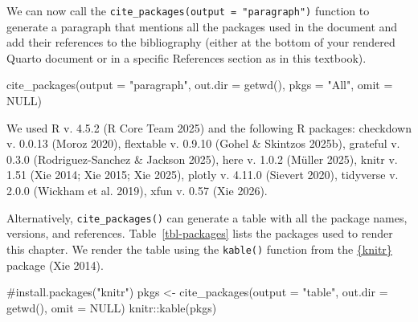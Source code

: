 \documentclass[
  letterpaper,
  DIV=11,
  numbers=noendperiod]{scrreprt}
\newenvironment{Shaded}{\begin{snugshade}}{\end{snugshade}}
\newcommand{\AttributeTok}[1]{\textcolor[rgb]{0.40,0.45,0.13}{#1}}
\newcommand{\CommentTok}[1]{\textcolor[rgb]{0.37,0.37,0.37}{#1}}
\newcommand{\ConstantTok}[1]{\textcolor[rgb]{0.56,0.35,0.01}{#1}}
\newcommand{\FunctionTok}[1]{\textcolor[rgb]{0.28,0.35,0.67}{#1}}
\newcommand{\NormalTok}[1]{\textcolor[rgb]{0.00,0.23,0.31}{#1}}
\newcommand{\OtherTok}[1]{\textcolor[rgb]{0.00,0.23,0.31}{#1}}
\newcommand{\SpecialCharTok}[1]{\textcolor[rgb]{0.37,0.37,0.37}{#1}}
\newcommand{\StringTok}[1]{\textcolor[rgb]{0.13,0.47,0.30}{#1}}
\begin{document}
We can now call the \texttt{cite\_packages(output\ =\ "paragraph")}
function to generate a paragraph that mentions all the packages used in
the document and add their references to the bibliography (either at the
bottom of your rendered Quarto document or in a specific References
section as in this textbook).

\begin{Shaded}
\begin{Highlighting}[]
\FunctionTok{cite\_packages}\NormalTok{(}\AttributeTok{output =} \StringTok{"paragraph"}\NormalTok{, }
              \AttributeTok{out.dir =} \FunctionTok{getwd}\NormalTok{(), }
              \AttributeTok{pkgs =} \StringTok{"All"}\NormalTok{,}
              \AttributeTok{omit =} \ConstantTok{NULL}\NormalTok{)}
\end{Highlighting}
\end{Shaded}

We used R v. 4.5.2 (R Core Team 2025) and the following R packages:
checkdown v. 0.0.13 (Moroz 2020), flextable v. 0.9.10 (Gohel \& Skintzos
2025b), grateful v. 0.3.0 (Rodriguez-Sanchez \& Jackson 2025), here v.
1.0.2 (Müller 2025), knitr v. 1.51 (Xie 2014; Xie 2015; Xie 2025),
plotly v. 4.11.0 (Sievert 2020), tidyverse v. 2.0.0 (Wickham et al.
2019), xfun v. 0.57 (Xie 2026).

Alternatively, \texttt{cite\_packages()} can generate a table with all
the package names, versions, and references. Table~\ref{tbl-packages}
lists the packages used to render this chapter. We render the table
using the \texttt{kable()} function from the
\href{https://github.com/yihui/knitr}{\{knitr\}} package (Xie 2014).

\begin{Shaded}
\begin{Highlighting}[]
\CommentTok{\#install.packages("knitr")}
\NormalTok{pkgs }\OtherTok{\textless{}{-}} \FunctionTok{cite\_packages}\NormalTok{(}\AttributeTok{output =} \StringTok{"table"}\NormalTok{, }
                      \AttributeTok{out.dir =} \FunctionTok{getwd}\NormalTok{(), }
                      \AttributeTok{omit =} \ConstantTok{NULL}\NormalTok{)}
\NormalTok{knitr}\SpecialCharTok{::}\FunctionTok{kable}\NormalTok{(pkgs)}
\end{Highlighting}
\end{Shaded}
\end{document}
